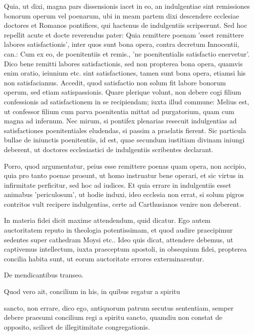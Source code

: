 Quia, ut dixi, magna pars dissensionis iacet in eo, an indulgentiae sint remissiones bonorum operum vel poenarum, ubi in meam partem dixi descendere ecclesiae doctores et Romanos pontifices, qui hactenus de indulgentiis scripserunt. Sed hoc repellit acute et docte reverendus pater: Quia remittere poenam 'esset remittere labores satisfactionis', inter quos sunt bona opera, contra decretum Innocentii, can.: Cum ex eo, de poenitentiis et remis., 'ne poenitentialis satisfactio enervetur'. Dico bene remitti labores satisfactionis, sed non propterea bona opera, quamvis enim oratio, ieiunium etc. sint satisfactiones, tamen sunt bona opera, etiamsi his non satisfaciamus. Accedit, quod satisfactio non solum fit labore bonorum operum, sed etiam satispassionis. Quare plerique volunt, non debere cogi filium confessionis ad satisfactionem in se recipiendam; iuxta illud commune: Melius est, ut confessor filium cum parva poenitentia mittat ad purgatorium, quam cum magna ad infernum. Nec mirum, si pontifex plenarias resecuit indulgentias ad satisfactiones poenitentiales eludendas, si passim a praelatis fierent. Sic particula bullae de iniunctis poenitentiis, id est, quae secundum iustitiam divinam iniungi deberent, ut doctores ecclesiastici de indulgentiis scribentes declarant.

Porro, quod argumentatur, peius esse remittere poenas quam opera, non accipio, quia pro tanto poenae prosunt, ut homo instruatur bene operari, et sic virtus in infirmitate perficitur, sed hoc ad iudices. Et quia errare in indulgentiis esset animabus 'periculosum', ut hodie induxi, ideo ecclesia non errat, si solum pigros contritos vult recipere indulgentias, certe ad Carthusianos venire non deberent.

\marginpar{\small[358]} In materia fidei dicit maxime attendendum, quid dicatur. Ego autem auctoritatem reputo in theologia potentissimam, et quod audire praecipimur sedentes super cathedram Moysi etc.. Ideo quis dicat, attendere debemus, ut captivemus intellectum, iuxta praeceptum apostoli, in obsequium fidei, propterea concilia habita sunt, ut eorum auctoritate errores exterminarentur.

De mendicantibus transeo.

Quod vero ait, concilium in his, in quibus regatur a spiritu

sancto, non errare, dico ego, antiquorum patrum secutus sententiam, semper debere praesumi concilium regi a spiritu sancto, quamdiu non constat de opposito, scilicet de illegitimitate congregationis.

